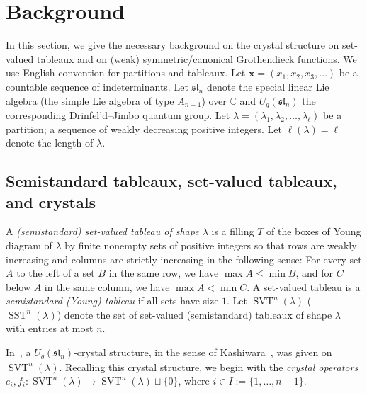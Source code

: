 \documentclass[ALCO,ThmDefs,Unicode,epreuves]{cedram}
\newcommand{\xx}{\mathbf{x}}
\newcommand{\fsl}{\mathfrak{sl}}
\DeclareMathOperator{\ssyt}{SST} %
\DeclareMathOperator{\svt}{SVT} %
\newcommand{\CC}{\mathbb{C}}
\newcommand{\defn}[1]{{\color{darkred}\emph{#1}}} %
\begin{document}
\section{Background}
\label{sec:background}

In this section, we give the necessary background on the crystal structure on set-valued tableaux and on (weak) symmetric/canonical Grothendieck functions.
We use English convention for partitions and tableaux.
Let $\xx = (x_1, x_2, x_3, \ldots)$ be a countable sequence of indeterminants.
Let $\fsl_n$ denote the special linear Lie algebra (\ie the simple Lie algebra of type $A_{n-1}$) over $\CC$ and $U_q(\fsl_n)$ the corresponding Drinfel'd--Jimbo quantum group.
Let $\lambda = (\lambda_1, \lambda_2, \dotsc, \lambda_{\ell})$ be a partition; a sequence of weakly decreasing positive integers.
Let $\ell(\lambda) = \ell$ denote the length of $\lambda$.

\subsection{Semistandard tableaux, set-valued tableaux, and crystals}

A \defn{(semistandard) set-valued tableau of shape $\lambda$} is a filling $T$ of the boxes of Young diagram of $\lambda$ by finite nonempty sets of positive integers so that rows are weakly increasing and columns are strictly increasing in the following sense:
For every set $A$ to the left of a set $B$ in the same row, we have $\max A \leq \min B$, and for $C$ below $A$ in the same column, we have $\max A < \min C$.
A set-valued tableau is a \defn{semistandard (Young) tableau} if all sets have size $1$.
Let $\svt^n(\lambda)$ (\resp $\ssyt^n(\lambda)$) denote the set of set-valued (\resp semistandard) tableaux of shape $\lambda$ with entries at most $n$.

In~\cite{MPS18}, a $U_q(\fsl_n)$-crystal structure, in the sense of Kashiwara~\cite{K90,K91}, was given on $\svt^n(\lambda)$.
Recalling this crystal structure, we begin with the \defn{crystal operators} $e_i, f_i \colon \svt^n(\lambda) \to \svt^n(\lambda) \sqcup \{0\}$, where $i \in I := \{1, \dotsc, n-1\}$.
\end{document}
